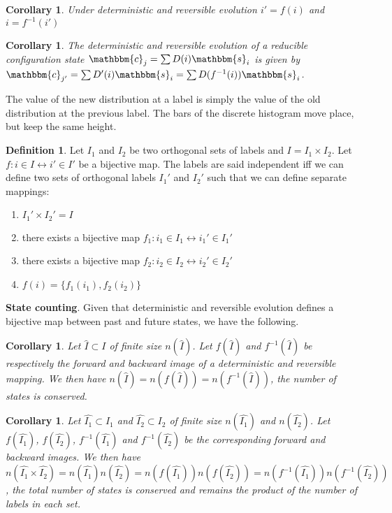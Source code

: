 \documentclass[twocolumn,floatfix,nofootinbib]{revtex4}   %
\theoremstyle{theorem}
\newtheorem{cor}[thm]{Corollary}
\theoremstyle{definition}
\newtheorem{defn}[thm]{Definition}
\begin{document}
\begin{cor}\label{detAndRev}
Under deterministic and reversible evolution $i'=f(i)$ and $i=f^{-1}(i')$
\end{cor}

\begin{cor}\label{discreteEv}
The deterministic and reversible evolution of a reducible configuration state $\mathbbm{c}_j=\sum D(i) \mathbbm{s}_i$ is given by $\mathbbm{c}_{j'}=\sum D'(i) \mathbbm{s}_{i}=\sum D(f^{-1}(i)) \mathbbm{s}_{i}$.
\end{cor}

The value of the new distribution at a label is simply the value of the old distribution at the previous label. The bars of the discrete histogram move place, but keep the same height.

\begin{defn}\label{labelsIndep}
Let $I_1$ and $I_2$ be two orthogonal sets of labels and $I = I_1 \times I_2$. Let $f:i \in I \leftrightarrow i' \in I'$ be a bijective map. The labels are said independent iff we can define two sets of orthogonal labels $I_1'$ and $I_2'$ such that we can define separate mappings:
\begin{enumerate}
\item $I_1' \times I_2' = I$
\item there exists a bijective map $f_1: i_1 \in I_1 \leftrightarrow i_1' \in I_1'$
\item there exists a bijective map $f_2: i_2 \in I_2 \leftrightarrow i_2' \in I_2'$
\item $f(i) = \{f_1(i_1), f_2(i_2)\}$
\end{enumerate}
\end{defn}

\textbf{State counting}. Given that deterministic and reversible evolution defines a bijective map between past and future states, we have the following.

\begin{cor}\label{labelsCount}
Let $\hat{I} \subset I$ of finite size $n(\hat{I})$. Let $f(\hat{I})$ and $f^{-1}(\hat{I})$ be respectively the forward and backward image of a deterministic and reversible mapping. We then have $n(\hat{I})=n(f(\hat{I}))=n(f^{-1}(\hat{I}))$, the number of states is conserved.
\end{cor}

\begin{cor}\label{labelsMultiCount}
Let $\hat{I_1} \subset I_1$ and $\hat{I_2} \subset I_2$ of finite size $n(\hat{I_1})$ and $n(\hat{I_2})$. Let $f(\hat{I_1})$, $f(\hat{I_2})$, $f^{-1}(\hat{I_1})$ and $f^{-1}(\hat{I_2})$ be the corresponding forward and backward images. We then have $n(\hat{I_1}\times\hat{I_2})=n(\hat{I_1})n(\hat{I_2})=n(f(\hat{I_1})) n(f(\hat{I_2}))=n(f^{-1}(\hat{I_1})) n(f^{-1}(\hat{I_2}))$, the total number of states is conserved and remains the product of the number of labels in each set.
\end{cor}
\end{document}

